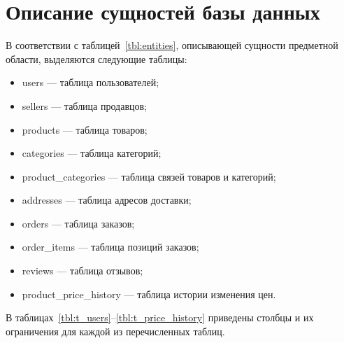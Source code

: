
\section{Описание сущностей базы данных}

В соответствии с таблицей~\ref{tbl:entities}, описывающей сущности предметной области, выделяются следующие таблицы:

\begin{itemize}
    \item users --- таблица пользователей;
    \item sellers --- таблица продавцов;
    \item products --- таблица товаров;
    \item categories --- таблица категорий;
    \item product\_categories --- таблица связей товаров и категорий;
    \item addresses --- таблица адресов доставки;
    \item orders --- таблица заказов;
    \item order\_items --- таблица позиций заказов;
    \item reviews --- таблица отзывов;
    \item product\_price\_history --- таблица истории изменения цен.
\end{itemize}

В таблицах~\ref{tbl:t_users}--\ref{tbl:t_price_history} приведены столбцы и их ограничения для каждой из перечисленных таблиц.

